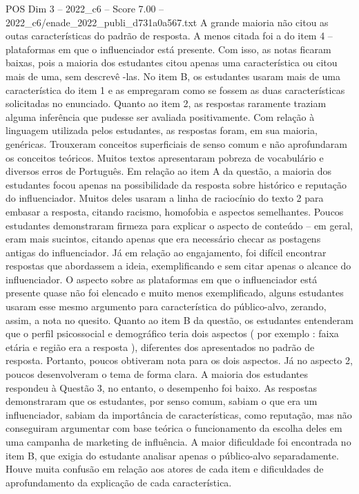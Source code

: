 \begin{textsample}{POS Dim 3 – 2022\_c6 – Score 7.00 – 2022\_c6/enade\_2022\_publi\_d731a0a567.txt}
A grande maioria não citou as outas características do padrão de resposta.
A menos citada foi a do item 4 – plataformas em que o influenciador está presente.
Com isso, as notas ficaram baixas, pois a maioria dos estudantes citou apenas uma característica ou citou mais de uma, sem descrevê -las.
No item B, os estudantes usaram mais de uma característica do item 1 e as empregaram como se fossem as duas características solicitadas no enunciado.
Quanto ao item 2, as respostas raramente traziam alguma inferência que pudesse ser avaliada positivamente.
Com relação à linguagem utilizada pelos estudantes, as respostas foram, em sua maioria, genéricas.
Trouxeram conceitos superficiais de senso comum e não aprofundaram os conceitos teóricos.
Muitos textos apresentaram pobreza de vocabulário e diversos erros de Português.
Em relação ao item A da questão, a maioria dos estudantes focou apenas na possibilidade da resposta sobre histórico e reputação do influenciador.
Muitos deles usaram a linha de raciocínio do texto 2 para embasar a resposta, citando racismo, homofobia e aspectos semelhantes.
Poucos estudantes demonstraram firmeza para explicar o aspecto de conteúdo – em geral, eram mais sucintos, citando apenas que era necessário checar as postagens antigas do influenciador.
Já em relação ao engajamento, foi difícil encontrar respostas que abordassem a ideia, exemplificando e sem citar apenas o alcance do influenciador.
O aspecto sobre as plataformas em que o influenciador está presente quase não foi elencado e muito menos exemplificado, alguns estudantes usaram esse mesmo argumento para característica do público-alvo, zerando, assim, a nota no quesito.
Quanto ao item B da questão, os estudantes entenderam que o perfil psicossocial e demográfico teria dois aspectos ( por exemplo : faixa etária e região era a resposta ), diferentes dos apresentados no padrão de resposta.
Portanto, poucos obtiveram nota para os dois aspectos.
Já no aspecto 2, poucos desenvolveram o tema de forma clara.
A maioria dos estudantes respondeu à Questão 3, no entanto, o desempenho foi baixo.
As respostas demonstraram que os estudantes, por senso comum, sabiam o que era um influenciador, sabiam da importância de características, como reputação, mas não conseguiram argumentar com base teórica o funcionamento da escolha deles em uma campanha de marketing de influência.
A maior dificuldade foi encontrada no item B, que exigia do estudante analisar apenas o público-alvo separadamente.
Houve muita confusão em relação aos atores de cada item e dificuldades de aprofundamento da explicação de cada característica.

\end{textsample}
